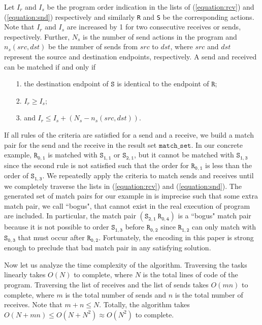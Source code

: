 Let $I_r$ and $I_s$ be the program order indication in the lists of (\ref{equation:rcv}) and (\ref{equation:snd}) respectively and similarly \texttt{R} and \texttt{S} be the corresponding actions. Note that $I_r$ and $I_s$ are increased by 1 for two consecutive receives or sends, respectively. Further, $N_s$ is the number of send actions in the program and $n_s(\mathit{src},\mathit{dst})$ be the number of sends from $\mathit{src}$ to $\mathit{dst}$, where $\mathit{src}$ and $\mathit{dst}$ represent the source and destination endpoints, respectively. A send and received can be matched if and only if
\begin{itemize}
\item[1.] the destination endpoint of $\mathtt{S}$ is identical to the endpoint of $\mathtt{R}$;
\item[2.] $I_r \geq I_s$;
\item[3.] and $I_r \leq I_s + (N_s - n_s(\mathit{src},\mathit{dst}))$.
\end{itemize}
If all rules of the criteria are satisfied for a send and a receive, we build a match pair for the send and the receive in the result set $\mathtt{match\_set}$. In our concrete example, $\mathtt{R_{0,1}}$ is matched with $\mathtt{S_{1,1}}$ or $\mathtt{S_{2,1}}$, but it cannot be matched with $\mathtt{S_{1,3}}$ since the second rule is not satisfied such that the order for $\mathtt{R_{0,1}}$ is less than the order of $\mathtt{S_{1,3}}$. We repeatedly apply the criteria to match sends and receives until we completely traverse the lists in (\ref{equation:rcv}) and (\ref{equation:snd}). The generated set of match pairs for our example in  is imprecise such that some extra match pair, we call ``bogus", that cannot exist in the real execution of program are included. In particular, the match pair $(\mathtt{S_{2,1}}\ \mathtt{R_{0,4}})$ is a ``bogus" match pair because it is not possible to order $\mathtt{S_{1,3}}$ before $\mathtt{R_{0,2}}$ since $\mathtt{R_{1,2}}$ can only match with $\mathtt{S_{0,3}}$ that must occur after $\mathtt{R_{0,2}}$. Fortunately, the encoding in this paper is strong enough to preclude that bad match pair in any satisfying solution.


Now let us analyze the time complexity of the algorithm. Traversing the tasks linearly takes $O(N)$ to complete, where $N$ is the total lines of code of the program. Traversing the list of receives and the list of sends takes $O(mn)$ to complete, where $m$ is the total number of sends and $n$ is the total number of receives. Note that $m + n \le N$. Totally, the algorithm takes $O(N + mn) \leq O(N + N^2) \approx O(N^2)$ to complete.

